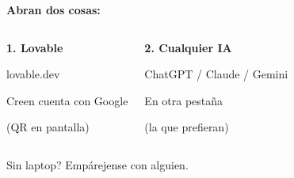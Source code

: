 \documentclass[aspectratio=169]{beamer}
\begin{document}
\begin{frame}[plain]
\begin{center}
\vspace{1cm}
{\fontsize{24}{28}\selectfont\color{textwhite}\bfseries Abran dos cosas:}

\vspace{0.8cm}

\begin{columns}[c]
\begin{center}
{\fontsize{18}{22}\selectfont\color{accent}\textbf{1. Lovable}}

\vspace{0.3cm}
{\large\color{textwhite} lovable.dev}

\vspace{0.2cm}
{\color{textgray} Creen cuenta con Google}

\vspace{0.3cm}
{\small\color{textgray} (QR en pantalla)}
\end{center}

\begin{center}
{\fontsize{18}{22}\selectfont\color{accent}\textbf{2. Cualquier IA}}

\vspace{0.3cm}
{\large\color{textwhite} ChatGPT / Claude / Gemini}

\vspace{0.2cm}
{\color{textgray} En otra pesta\~na}

\vspace{0.3cm}
{\small\color{textgray} (la que prefieran)}
\end{center}
\end{columns}

\vspace{1cm}
{\color{warning}\large Sin laptop? Emp\'arejense con alguien.}
\end{center}
\end{frame}
\end{document}
